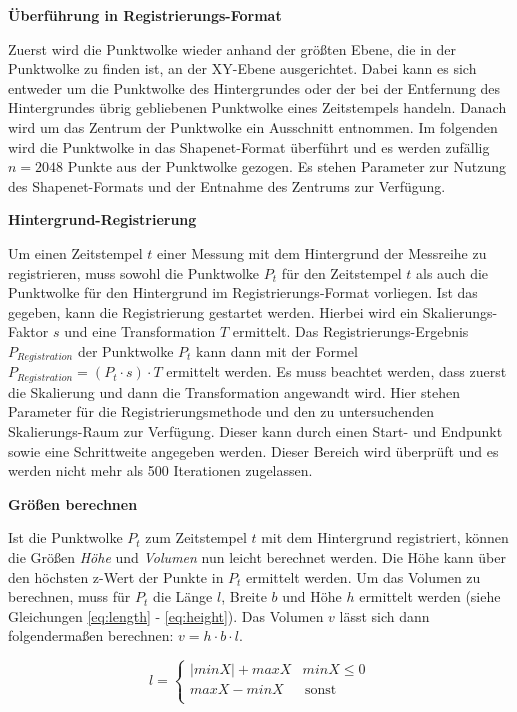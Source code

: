 \documentclass[12pt,titlepage, twoside]{article}
\begin{document}
\textbf{Überführung in Registrierungs-Format }

Zuerst wird die Punktwolke wieder anhand der größten Ebene, die in der Punktwolke zu finden ist, an der XY-Ebene ausgerichtet.
Dabei kann es sich entweder um die Punktwolke des Hintergrundes oder der bei der Entfernung des Hintergrundes übrig gebliebenen Punktwolke eines Zeitstempels handeln.
Danach wird um das Zentrum der Punktwolke ein Ausschnitt entnommen.
Im folgenden wird die Punktwolke in das Shapenet-Format überführt und es werden zufällig $n=2048$ Punkte aus der Punktwolke gezogen.
Es stehen Parameter zur Nutzung des Shapenet-Formats und der Entnahme des Zentrums zur Verfügung.

\textbf{Hintergrund-Registrierung}

Um einen Zeitstempel $t$ einer Messung mit dem Hintergrund der Messreihe zu registrieren, muss sowohl die Punktwolke $P_t$ für den Zeitstempel $t$ als auch die Punktwolke für den Hintergrund im Registrierungs-Format vorliegen.
Ist das gegeben, kann die Registrierung gestartet werden. Hierbei wird ein Skalierungs-Faktor $s$ und eine Transformation $T$ ermittelt. 
Das Registrierungs-Ergebnis $P_{Registration}$ der Punktwolke $P_t$ kann dann mit der Formel $P_{Registration} = (P_t \cdot s) \cdot T$ ermittelt werden. 
Es muss beachtet werden, dass zuerst die Skalierung und dann die Transformation angewandt wird. Hier stehen Parameter für die Registrierungsmethode und den zu untersuchenden Skalierungs-Raum zur Verfügung.
Dieser kann durch einen Start- und Endpunkt sowie eine Schrittweite angegeben werden. Dieser Bereich wird überprüft und es werden nicht mehr als 500 Iterationen zugelassen. 

\textbf{Größen berechnen}

Ist die Punktwolke $P_t$ zum Zeitstempel $t$ mit dem Hintergrund registriert, können die Größen \textit{Höhe} und \textit{Volumen} nun leicht berechnet werden.
Die Höhe kann über den höchsten z-Wert der Punkte in $P_t$ ermittelt werden. Um das Volumen zu berechnen, muss für $P_t$ die Länge $l$, Breite $b$ und Höhe $h$ ermittelt werden (siehe Gleichungen \ref{eq:length} - \ref{eq:height}). 
Das Volumen $v$ lässt sich dann folgendermaßen berechnen: $v = h \cdot b \cdot l$.

\begin{equation}
    \label{eq:length}
    l = \left\{
    \begin{array}{ll}
    |minX| + maxX & minX \leq 0 \\
    maxX - minX & \, \textrm{sonst} \\
    \end{array}
    \right. 
\end{equation}
\end{document}
